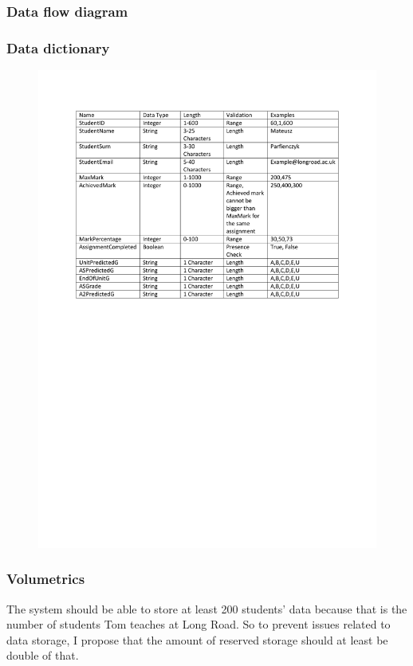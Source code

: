 \begin{algorithm}[H]
\subsubsection{Data flow diagram}

\subsubsection{Data dictionary}
\begin{figure}[H]
    \includegraphics[width=\textwidth]{./Analysis/images/DataDictionary.pdf}
\end{figure}

\subsubsection{Volumetrics}
The system should be able to store at least 200 students' data because that is the number of students Tom teaches at Long Road. 
So to prevent issues related to data storage, I propose that the amount of reserved storage should at least be double of that.


\end{algorithm}
